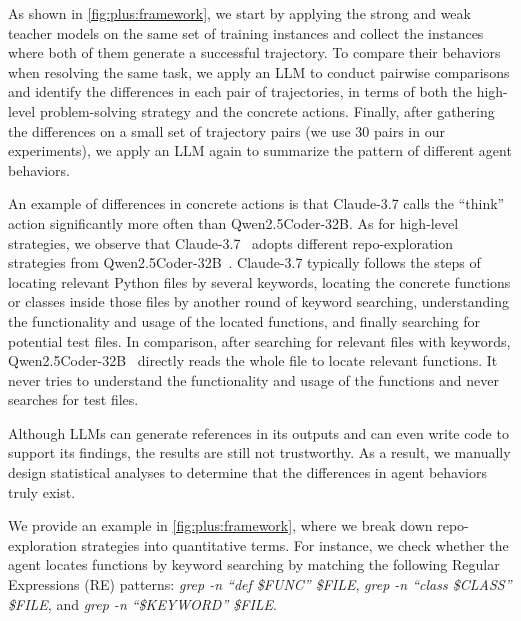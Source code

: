 \label{plus:sec:discovery}
As shown in \autoref{fig:plus:framework}, we start by applying the strong and weak teacher models on the same set of training instances and collect the instances where both of them generate a successful trajectory.
To compare their behaviors when resolving the same task, we apply an LLM to conduct pairwise comparisons and identify the differences in each pair of trajectories, in terms of both the high-level problem-solving strategy and the concrete actions.
Finally, after gathering the differences on a small set of trajectory pairs (we use 30 pairs in our experiments), we apply an LLM again to summarize the pattern of different agent behaviors.

An example of differences in concrete actions is that Claude-3.7 calls the ``think'' action significantly more often than Qwen2.5Coder-32B.
As for high-level strategies, we observe that Claude-3.7~\cite{claude37} adopts different repo-exploration strategies from Qwen2.5Coder-32B~\cite{qwen25coder}. 
Claude-3.7 typically follows the steps of locating relevant Python files by several keywords, locating the concrete functions or classes inside those files by another round of keyword searching, understanding the functionality and usage of the located functions, and finally searching for potential test files.
In comparison, after searching for relevant files with keywords, Qwen2.5Coder-32B~\cite{qwen25coder} directly reads the whole file to locate relevant functions. It never tries to understand the functionality and usage of the functions and never searches for test files.

Although LLMs can generate references in its outputs and can even write code to support its findings, the results are still not trustworthy.
As a result, we manually design statistical analyses to determine that the differences in agent behaviors truly exist.

We provide an example in \autoref{fig:plus:framework}, where we break down repo-exploration strategies into quantitative terms.
For instance, we check whether the agent locates functions by keyword searching by matching the following Regular Expressions (RE) patterns: \textit{grep -n ``def \$FUNC'' \$FILE}, \textit{grep -n ``class \$CLASS'' \$FILE}, and \textit{grep -n ``\$KEYWORD'' \$FILE}.


